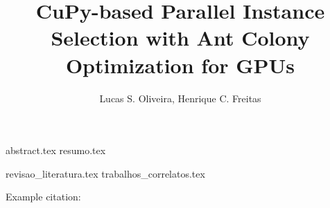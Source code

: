 \documentclass[12pt]{article}
\title{CuPy-based Parallel Instance Selection with Ant Colony Optimization for GPUs}
\author{{Lucas S. Oliveira\inst{1}, Henrique C. Freitas\inst{1}}}
\begin{document}
 

\maketitle

{abstract.tex}
{resumo.tex}

{revisao_literatura.tex}
{trabalhos_correlatos.tex}

Example citation:
\cite{AntColonyOptimization}

\printbibliography
\end{document}
